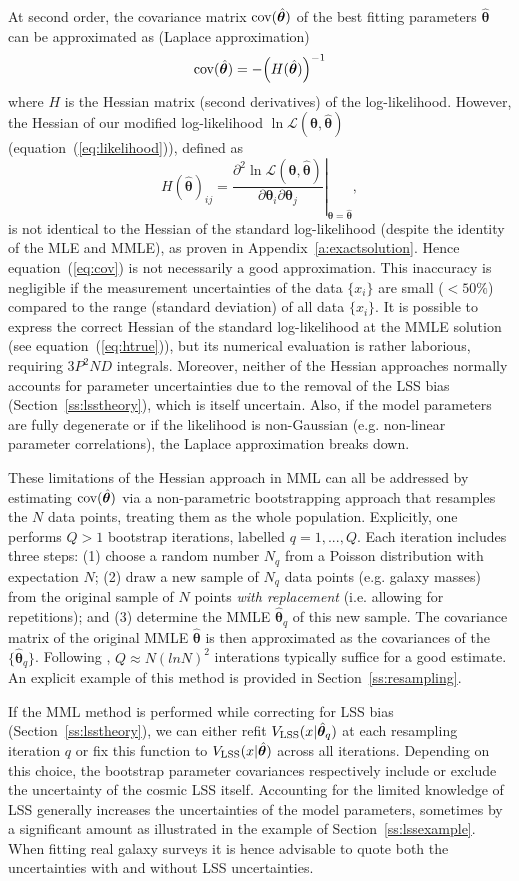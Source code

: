 \documentclass[a4paper,fleqn,usenatbib]{mnras}
\newcommand{\be}{\begin{equation}}
\newcommand{\ee}{\end{equation}}
\newcommand{\vefflss}{V_{\rm LSS}}%
\renewcommand{\L}{\mathcal{L}}
\newcommand{\eq}[1]{equation~(\ref{eq:#1})}
\renewcommand{\ss}[1]{Section~\ref{ss:#1}}
\renewcommand{\a}[1]{Appendix~\ref{a:#1}}
\newcommand{\ie}{i.e.\xspace}
\newcommand{\eg}{e.g.\xspace}
\newcommand{\cov}{{\rm cov}}
\newcommand{\para}{{\bm{\theta}}}
\begin{document}
At second order, the covariance matrix $\cov(\hat\para)$ of the best fitting parameters $\hat\para$ can be approximated as (Laplace approximation)
%
\be\label{eq:cov}
	\cov(\hat\para) = -\Big(H(\hat\para)\Big)^{-1}
\ee
%
where $H$ is the Hessian matrix (second derivatives) of the log-likelihood. However, the Hessian of our modified log-likelihood $\ln\L(\para,\hat\para)$ (\eq{likelihood}), defined as
%
\be\label{eq:hessian}
	H(\hat\para)_{ij} = \left.\frac{\partial^2\ln\L(\para,\hat\para)}{\partial\para_i\partial\para_j}\right|_{\para=\hat\para},
\ee
%
is not identical to the Hessian of the standard log-likelihood (despite the identity of the MLE and MMLE), as proven in \a{exactsolution}. Hence \eq{cov} is not necessarily a good approximation. This inaccuracy is negligible if the measurement uncertainties of the data $\{x_i\}$ are small ($<50\%$) compared to the range (standard deviation) of all data $\{x_i\}$. It is possible to express the correct Hessian of the standard log-likelihood at the MMLE solution (see \eq{htrue}), but its numerical evaluation is rather laborious, requiring $3P^2ND$ integrals. Moreover, neither of the Hessian approaches normally accounts for parameter uncertainties due to the removal of the LSS bias (\ss{lsstheory}), which is itself uncertain. Also, if the model parameters are fully degenerate or if the likelihood is non-Gaussian (\eg non-linear parameter correlations), the Laplace approximation breaks down.

These limitations of the Hessian approach in MML can all be addressed by estimating $\cov(\hat\para)$ via a non-parametric bootstrapping \citep{Efron1993} approach that resamples the $N$ data points, treating them as the whole population. Explicitly, one performs $Q>1$ bootstrap iterations, labelled $q=1,...,Q$. Each iteration includes three steps: (1) choose a random number $N_q$ from a Poisson distribution with expectation $N$; (2) draw a new sample of $N_q$ data points (e.g. galaxy masses) from the original sample of $N$ points \emph{with replacement} (\ie allowing for repetitions); and (3) determine the MMLE $\hat\para_q$ of this new sample. The covariance matrix of the original MMLE $\hat\para$ is then approximated as the covariances of the $\{\hat\para_q\}$. Following \cite{Babu1983}, $Q\approx N(ln N)^2$ interations typically suffice for a good estimate. An explicit example of this method is provided in \ss{resampling}.

If the MML method is performed while correcting for LSS bias (\ss{lsstheory}), we can either refit $\vefflss(x|\hat\para_q)$ at each resampling iteration $q$ or fix this function to $\vefflss(x|\hat\para)$ across all iterations. Depending on this choice, the bootstrap parameter covariances respectively include or exclude the uncertainty of the cosmic LSS itself. Accounting for the limited knowledge of LSS generally increases the uncertainties of the model parameters, sometimes by a significant amount as illustrated in the example of \ss{lssexample}. When fitting real galaxy surveys it is hence advisable to quote both the uncertainties with and without LSS uncertainties.
\end{document}
